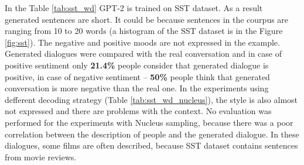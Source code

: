 In the Table \ref{tab:sst_wd} GPT-2 is trained on SST dataset. As a result generated sentences are short. It could be because sentences in the courpus are ranging from 10 to 20 words (a histogram of the SST dataset is in the Figure \ref{fig:sst}). The negative and positive moods are not expressed in the example. Generated dialogues were compared with the real conversation and in case of positive sentiment only \textbf{21.4\%} people consider that generated dialogue is positive, in case of negative sentiment -- \textbf{50\%} people think that generated conversation is more negative than the real one. In the experiments using defferent decoding strategy (Table \ref{tab:sst_wd_nucleus}), the style is also almost not expressed and there are problems with the context. No evaluation was performed for the experiments with Nucleus sampling, because there was a poor correlation between the description of people and the generated dialogue. In these dialogues, some films are often described, because SST dataset contains sentences from movie reviews.

